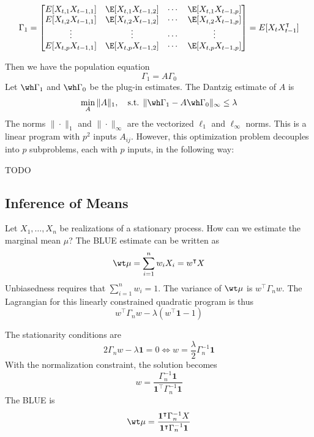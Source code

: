 \[\Gamma_1 =
\begin{bmatrix}
E[X_{t,1}X_{t-1,1}] & \E[X_{t,1}X_{t-1,2}] & \cdots & \E[X_{t,1}X_{t-1,p}] \\
E[X_{t,2}X_{t-1,1}] & \E[X_{t,2}X_{t-1,2}] & \cdots & \E[X_{t,2}X_{t-1,p}] \\
\vdots & \vdots & \cdots & \vdots \\
E[X_{t,p}X_{t-1,1}] & \E[X_{t,p}X_{t-1,2}] & \cdots & \E[X_{t,p}X_{t-1,p}]
\end{bmatrix}
=
E[X_t X_{t-1}^\intercal]\]

Then we have the population equation
\[\Gamma_1 = A \Gamma_0\]
Let \(\wh\Gamma_1\) and \(\wh\Gamma_0\) be the plug-in estimates. The Dantzig estimate of \(A\) is
\[\min_A \|A\|_1, \quad \text{s.t. } \|\wh\Gamma_1 - A\wh\Gamma_0\|_\infty \leq \lambda\]
The norms \(\|\cdot\|_1\) and \(\|\cdot\|_\infty\) are the vectorized \(\ell_1\) and \(\ell_\infty\) norms. This is a linear program with \(p^2\) inputs \(A_{ij}\). However, this optimization problem decouples into \(p\) subproblems, each with \(p\) inputs, in the following way:

TODO

\subsection*{Inference of Means}
Let \(X_1, \dots, X_n\) be realizations of a stationary process. How can we estimate the marginal mean \(\mu\)? The BLUE estimate can be written as
\[\wt \mu = \sum_{i=1}^n w_i X_i = w^\intercal X\]
Unbiasedness requires that \(\sum_{i=1}^n w_i = 1\). The variance of \(\wt \mu\) is \(w^\intercal \Gamma_n w\). The Lagrangian for this linearly constrained quadratic program is thus
\[w^\intercal \Gamma_n w - \lambda (w^\intercal \mathbf{1} - 1)\]

The stationarity conditions are
\[2\Gamma_n w - \lambda \mathbf{1} = 0 \iff w = \frac{\lambda}{2}\Gamma_n^{-1}\mathbf{1}\]
With the normalization constraint, the solution becomes
\[w = \frac{\Gamma_n^{-1} \mathbf{1}}{\mathbf{1}^\intercal \Gamma_n^{-1} \mathbf{1}}\]
The BLUE is
\[\wt \mu = \frac{\mathbf{1}^\intercal \Gamma_n^{-1} X}{\mathbf{1}^\intercal \Gamma_n^{-1} \mathbf{1}}\]

